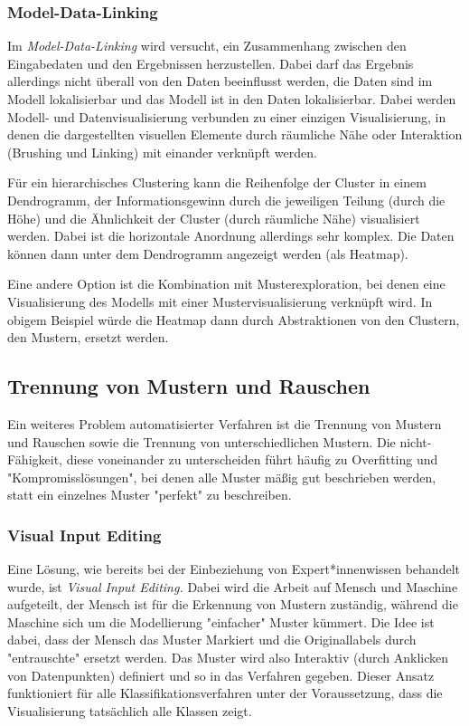 			\subsubsection{Model-Data-Linking}
				Im \emph{Model-Data-Linking} wird versucht, ein Zusammenhang zwischen den Eingabedaten und den Ergebnissen herzustellen. Dabei darf das Ergebnis allerdings nicht überall von den Daten beeinflusst werden, \dh die Daten sind im Modell lokalisierbar und das Modell ist in den Daten lokalisierbar. Dabei werden Modell- und Datenvisualisierung verbunden zu einer einzigen Visualisierung, in denen die dargestellten visuellen Elemente durch räumliche Nähe oder Interaktion (Brushing und Linking) mit einander verknüpft werden.

				Für ein hierarchisches Clustering kann \zB die Reihenfolge der Cluster in einem Dendrogramm, der Informationsgewinn durch die jeweiligen Teilung (durch die Höhe) und die Ähnlichkeit der Cluster (durch räumliche Nähe) visualisiert werden. Dabei ist die horizontale Anordnung allerdings sehr komplex. Die Daten können dann unter dem Dendrogramm angezeigt werden (\bspw als Heatmap).

				Eine andere Option ist die Kombination mit Musterexploration, bei denen eine Visualisierung des Modells mit einer Mustervisualisierung verknüpft wird. In obigem Beispiel würde die Heatmap dann durch Abstraktionen von den Clustern, den Mustern, ersetzt werden.

		\subsection{Trennung von Mustern und Rauschen}
			Ein weiteres Problem automatisierter Verfahren ist die Trennung von Mustern und Rauschen sowie die Trennung von unterschiedlichen Mustern. Die nicht-Fähigkeit, diese voneinander zu unterscheiden führt häufig zu Overfitting und "Kompromisslösungen", bei denen alle Muster mäßig gut beschrieben werden, statt ein einzelnes Muster "perfekt" zu beschreiben.

			\subsubsection{Visual Input Editing}
				Eine Lösung, wie bereits bei der Einbeziehung von Expert*innenwissen behandelt wurde, ist \emph{Visual Input Editing.} Dabei wird die Arbeit auf Mensch und Maschine aufgeteilt, \dh der Mensch ist für die Erkennung von Mustern zuständig, während die Maschine sich um die Modellierung "einfacher" Muster kümmert. Die Idee ist dabei, dass der Mensch das Muster Markiert und die Originallabels durch "entrauschte" ersetzt werden. Das Muster wird also Interaktiv (\bspw durch Anklicken von Datenpunkten) definiert und so in das Verfahren gegeben. Dieser Ansatz funktioniert für alle Klassifikationsverfahren unter der Voraussetzung, dass die Visualisierung tatsächlich alle Klassen zeigt.

